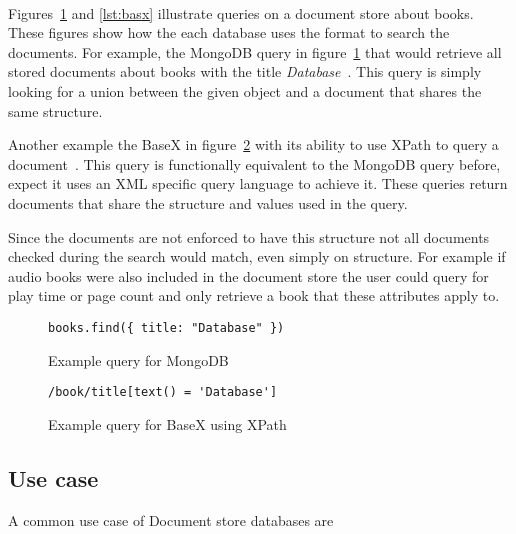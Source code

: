 \documentclass{CRPITStyle}
\renewcommand{\cite}{\citep}
\begin{document}
\paragraph{}
Figures~\ref{lst:mongo} and \ref{lst:basx} illustrate queries on a document
store about books.
These figures show how the each database uses the format to search
the documents.
For example, the MongoDB query in figure~\ref{lst:mongo} that would retrieve all
stored documents about books with the title \textit{Database}~\cite{mongodb}.
This query is simply looking for a union between the given object and a
document that shares the same structure.

Another example the BaseX in figure~\ref{lst:basex} with its
ability to use XPath to query a document~\cite{basex}.
This query is functionally equivalent to the MongoDB query before, expect it uses
an XML specific query language to achieve it.
These queries return documents that share the structure and values used in the
query.

Since the documents are not enforced to have this structure not all documents
checked during the search would match, even simply on structure.
For example if audio books were also included in the document store the user
could query for play time or page count and only retrieve a book that these
attributes apply to.

\begin{figure}
\begin{verbatim}
books.find({ title: "Database" })
\end{verbatim}
\caption{Example query for MongoDB}
\label{lst:mongo}
\end{figure}

\begin{figure}
\begin{verbatim}
/book/title[text() = 'Database']
\end{verbatim}
\caption{Example query for BaseX using XPath}
\label{lst:basex}
\end{figure}

\subsection{Use case}

A common use case of Document store databases are

\cite{nosql_performance}
\end{document}
